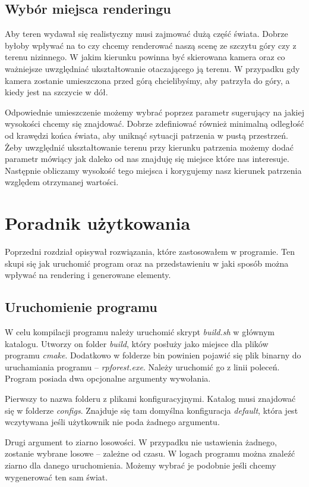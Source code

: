 \documentclass[inz,longabstract]{iithesis}
\begin{document}
    \section{Wybór miejsca renderingu}
        Aby teren wydawał się realistyczny musi zajmować dużą część świata. Dobrze byłoby wpływać na to czy chcemy renderować naszą scenę ze szczytu góry czy z terenu nizinnego. W jakim kierunku powinna być skierowana kamera oraz co ważniejsze uwzględniać ukształtowanie otaczającego ją terenu. W przypadku gdy kamera zostanie umieszczona przed górą chcielibyśmy, aby patrzyła do góry, a kiedy jest na szczycie w dół. 
        
        Odpowiednie umieszczenie możemy wybrać poprzez parametr sugerujący na jakiej wysokości chcemy się znajdować. Dobrze zdefiniować również minimalną odległość od krawędzi końca świata, aby uniknąć sytuacji patrzenia w pustą przestrzeń. Żeby uwzględnić ukształtowanie terenu przy kierunku patrzenia możemy dodać parametr mówiący jak daleko od nas znajduję się miejsce które nas interesuje. Następnie obliczamy wysokość tego miejsca i korygujemy nasz kierunek patrzenia względem otrzymanej wartości.
        
\chapter{Poradnik użytkowania}
    Poprzedni rozdział opisywał rozwiązania, które zastosowałem w programie. Ten skupi się jak uruchomić program oraz na przedstawieniu w jaki sposób można wpływać na rendering i generowane elementy.
    
    \section{Uruchomienie programu}
        W celu kompilacji programu należy uruchomić skrypt \textit{build.sh} w głównym katalogu. Utworzy on folder \textit{build}, który posłuży jako miejsce dla plików programu \textit{cmake}. Dodatkowo w folderze bin powinien pojawić się plik binarny do uruchamiania programu -- \textit{rpforest.exe}. Należy uruchomić go z linii poleceń. Program posiada dwa opcjonalne argumenty wywołania. 
        
        Pierwszy to nazwa folderu z plikami konfiguracyjnymi. Katalog musi znajdować się w folderze \textit{configs}. Znajduje się tam domyślna konfiguracja \textit{default}, która jest wczytywana jeśli użytkownik nie poda żadnego argumentu. 
        
        Drugi argument to ziarno losowości. W przypadku nie ustawienia żadnego, zostanie wybrane losowe -- zależne od czasu. W logach programu można znaleźć ziarno dla danego uruchomienia. Możemy wybrać je podobnie jeśli chcemy wygenerować ten sam świat. 
    
\end{document}
